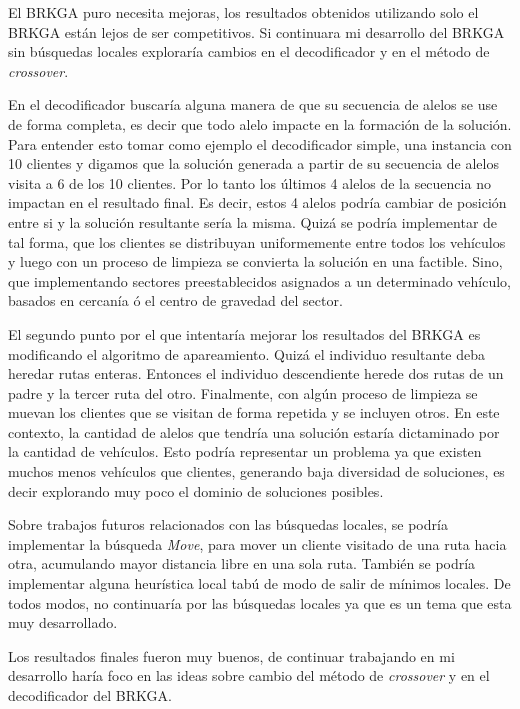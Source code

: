 \bigskip

El BRKGA puro necesita mejoras, los resultados obtenidos utilizando solo el BRKGA están lejos de ser competitivos. Si continuara mi desarrollo del BRKGA sin búsquedas locales exploraría cambios en el decodificador y en el método de \textit{crossover}. 

\bigskip

En el decodificador buscaría alguna manera de que su secuencia de alelos se use de forma completa, es decir que todo alelo impacte en la formación de la solución. Para entender esto tomar como ejemplo el decodificador simple, una instancia con 10 clientes y digamos que la solución generada a partir de su secuencia de alelos visita a 6 de los 10 clientes. Por lo tanto los últimos 4 alelos de la secuencia no impactan en el resultado final. Es decir, estos 4 alelos podría cambiar de posición entre si y la solución resultante sería la misma. Quizá se podría implementar de tal forma, que los clientes se distribuyan uniformemente entre todos los vehículos y luego con un proceso de limpieza se convierta la solución en una factible. Sino, que implementando sectores preestablecidos asignados a un determinado vehículo, basados en cercanía ó el centro de gravedad del sector.

\bigskip

El segundo punto por el que intentaría mejorar los resultados del BRKGA es modificando el algoritmo de apareamiento. Quizá el individuo resultante deba heredar rutas enteras. Entonces el individuo descendiente herede dos rutas de un padre y la tercer ruta del otro. Finalmente, con algún proceso de limpieza se muevan los clientes que se visitan de forma repetida y se incluyen otros. En este contexto, la cantidad de alelos que tendría una solución estaría dictaminado por la cantidad de vehículos. Esto podría representar un problema ya que existen muchos menos vehículos que clientes, generando baja diversidad de soluciones, es decir explorando muy poco el dominio de soluciones posibles.

\bigskip

Sobre trabajos futuros relacionados con las búsquedas locales, se podría implementar la búsqueda \textit{Move}, para mover un cliente visitado de una ruta hacia otra, acumulando mayor distancia libre en una sola ruta. También se podría implementar alguna heurística local tabú de modo de salir de mínimos locales. De todos modos, no continuaría por las búsquedas locales ya que es un tema que esta muy desarrollado.

\bigskip

Los resultados finales fueron muy buenos, de continuar trabajando en mi desarrollo haría foco en las ideas sobre cambio del método de \textit{crossover} y en el decodificador del BRKGA.








